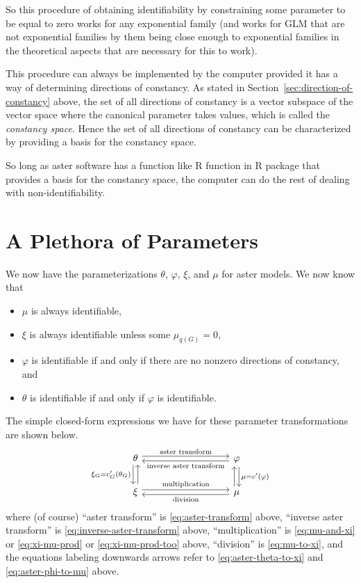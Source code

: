So this procedure of obtaining identifiability by constraining some
parameter to be equal to zero works for any exponential family
(and works for GLM that are not exponential families by them being
close enough to exponential families in the theoretical aspects that
are necessary for this to work).

This procedure can always be implemented by the computer provided it has
a way of determining directions of constancy.
As stated in Section~\ref{sec:direction-of-constancy}
above, the set of all directions of constancy is a vector subspace of the
vector space where the canonical parameter takes values,
which is called the \emph{constancy space}.
Hence the set of all directions of constancy can be characterized by
providing a basis for the constancy space.

So long as aster software has a function like R function 
in R package  that provides a basis for the constancy space,
the computer can do the rest of dealing with non-identifiability.

\section{A Plethora of Parameters}
\label{sec:plethora}

We now have the parameterizations $\theta$, $\varphi$, $\xi$, and $\mu$
for aster models.  We now know that
\begin{itemize}
\item $\mu$ is always identifiable,
\item $\xi$ is always identifiable unless some $\mu_{q(G)} = 0$,
\item $\varphi$ is identifiable if and only if there are no nonzero
    directions of constancy, and
\item $\theta$ is identifiable if and only if $\varphi$ is identifiable.
\end{itemize}


The simple closed-form expressions we have
for these parameter transformations are shown below.
\begin{equation} \label{eq:plethora-four}
\begin{tikzcd}[column sep=9em]
   \theta
   \arrow[r, "\text{aster transform}", shift left]
   \arrow[d, "\xi_G = c_G'(\theta_G)"', shift right]
   &
   \varphi
   \arrow[l, "\text{inverse aster transform}", shift left]
   \arrow[d, "\mu = c'(\varphi)", shift left]
   \\
   \xi
   \arrow[u, shift right]
   \arrow[r, "\text{multiplication}", shift left]
   &
   \mu
   \arrow[l, "\text{division}", shift left]
   \arrow[u, shift left]
\end{tikzcd}
\end{equation}
where (of course) ``aster transform'' is \eqref{eq:aster-transform} above,
``inverse aster transform'' is \eqref{eq:inverse-aster-transform} above,
``multiplication'' is \eqref{eq:mu-and-xi} or \eqref{eq:xi-mu-prod} or
\eqref{eq:xi-mu-prod-too} above,
``division'' is \eqref{eq:mu-to-xi}, and the equations labeling downwards
arrows refer to \eqref{eq:aster-theta-to-xi} and \eqref{eq:aster-phi-to-mu}
above.

